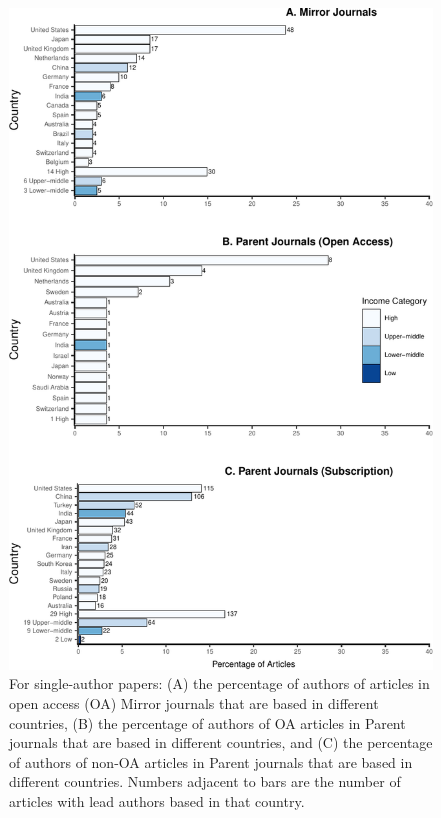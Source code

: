 \documentclass[
  english,
  man]{apa6}
\begin{document}
\begin{figure}

{\centering \includegraphics{Smith_etal_APC_ms_files/figure-latex/Fig1-1} 

}

\caption{For single-author papers: (A) the percentage of authors of articles in open access (OA) Mirror journals that are based in different countries, (B) the percentage of authors of OA articles in Parent journals that are based in different countries, and (C) the percentage of authors of non-OA articles in Parent journals that are based in different countries. Numbers adjacent to bars are the number of articles with lead authors based in that country.}\label{fig:Fig1}
\end{figure}
\end{document}
